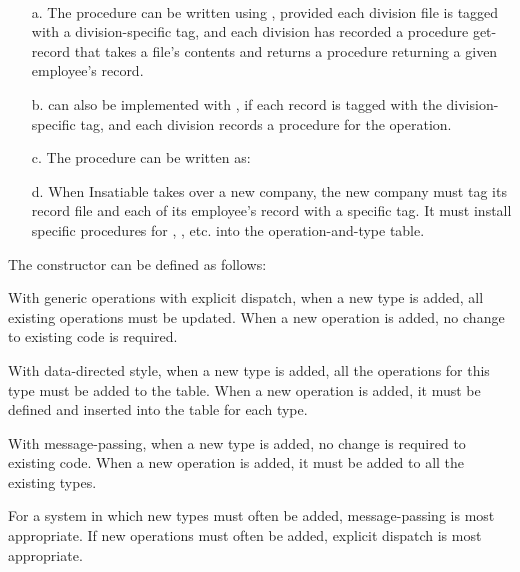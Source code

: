 \begin{exe}[2.74]
    \ \vspace{-20pt}
    \begin{itemize}
        \item[a.] The  procedure can be written using 
            , provided each division file is tagged with 
            a division-specific tag, and each division has recorded a procedure 
            get-record that takes a file’s contents and returns a procedure 
            returning a given employee’s record.
        \item[b.]  can also be implemented with 
            , if each record is tagged with the 
            division-specific tag, and each division records a procedure for the 
             operation.
        \item[c.] The  procedure can be written as:
        \item[d.] When Insatiable takes over a new company, the new company must 
            tag its record file and each of its employee’s record with 
            a specific tag. It must install specific procedures for 
            , , etc. into the 
            operation-and-type table.
    \end{itemize}
\end{exe}

\begin{exe}[2.75]
    The constructor  can be defined as follows:
\end{exe}

\begin{exe}[2.76]
    With generic operations with explicit dispatch, when a new type is added, 
    all existing operations must be updated. When a new operation is added, no 
    change to existing code is required.

    With data-directed style, when a new type is added, all the operations for 
    this type must be added to the table. When a new operation is added, it must be 
    defined and inserted into the table for each type.

    With message-passing, when a new type is added, no change is required to 
    existing code. When a new operation is added, it must be added to all the 
    existing types.

    \medskip

    For a system in which new types must often be added, message-passing is most 
    appropriate. If new operations must often be added, explicit dispatch is 
    most appropriate.
\end{exe}

